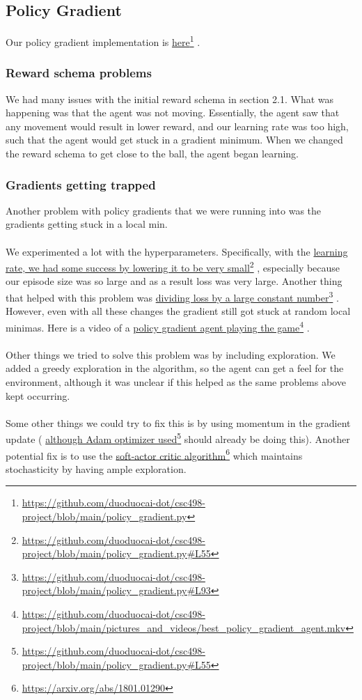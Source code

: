 \documentclass[twoside,11pt]{article}
\newcommand\fnurl[2]{%
  \href{#2}{#1}\footnote{\url{#2}}%
}
\begin{document}
\subsection{Policy Gradient}
Our policy gradient implementation is \fnurl{here}{https://github.com/duoduocai-dot/csc498-project/blob/main/policy_gradient.py}. 
\subsubsection{Reward schema problems}
We had many issues with the initial reward schema in section 2.1. What was happening was that the agent was not moving. Essentially, the agent saw that any movement would result in lower reward, and  our learning rate was too high, such that the agent would get stuck in a gradient minimum. When we changed the reward schema to get close to the ball, the agent began learning.
\subsubsection{Gradients getting trapped}
Another problem with policy gradients that we were running into was the gradients getting stuck in a local min. 
\\\\We experimented a lot with the hyperparameters. Specifically, with the \fnurl{learning rate, we had some success by lowering it to be very small}{https://github.com/duoduocai-dot/csc498-project/blob/main/policy_gradient.py\#L55}, especially because our episode size was so large and as a result loss was very large. Another thing that helped with this problem was \fnurl{dividing loss by a large constant number}{https://github.com/duoduocai-dot/csc498-project/blob/main/policy_gradient.py\#L93}. However, even with all these changes the gradient still got stuck at random local minimas. Here is a video of a \fnurl{policy gradient agent playing the game}{https://github.com/duoduocai-dot/csc498-project/blob/main/pictures_and_videos/best_policy_gradient_agent.mkv}.
\\\\
Other things we tried to solve this problem was by including exploration. We added a greedy exploration in the algorithm, so the agent can get a feel for the environment, although it was unclear if this helped as the same problems above kept occurring. 
\\\\
Some other things we could try to fix this is by using momentum in the gradient update (\fnurl{although Adam optimizer used}{https://github.com/duoduocai-dot/csc498-project/blob/main/policy_gradient.py\#L55} should already be doing this). Another potential fix is to use the \fnurl{soft-actor critic algorithm}{https://arxiv.org/abs/1801.01290} which maintains stochasticity by having ample exploration. 
\end{document}
